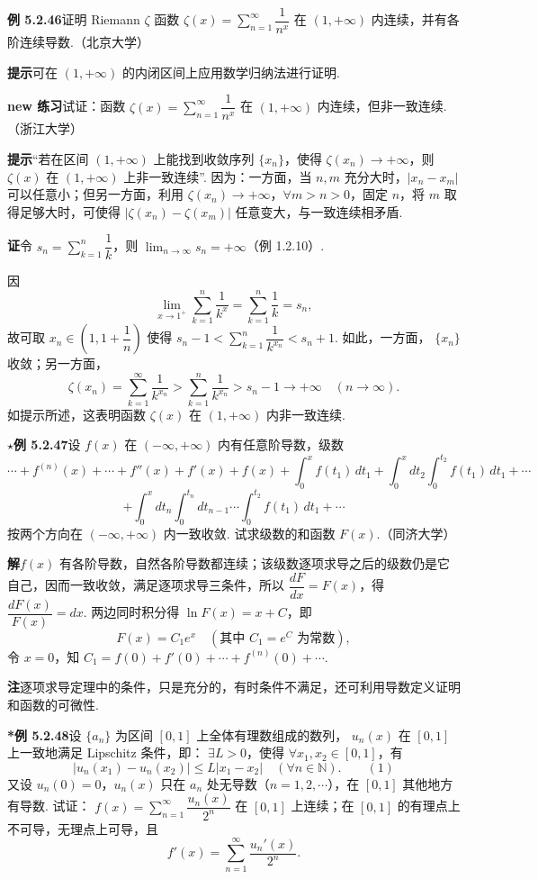 \documentclass[UTF8,12pt,a4paper,fontset=fandol]{ctexart}
\begin{document}
\noindent\textbf{例 5.2.46}\quad 证明 Riemann $\zeta$ 函数
$\zeta(x)=\displaystyle\sum_{n=1}^{\infty}\dfrac1{n^x}$ 在
$(1,+\infty)$ 内连续，并有各阶连续导数.（北京大学）

\noindent\textbf{提示}\quad 可在 $(1,+\infty)$ 的内闭区间上应用数学归纳法进行证明.

\noindent\textbf{new 练习}\quad 试证：函数
$\zeta(x)=\displaystyle\sum_{n=1}^{\infty}\dfrac1{n^x}$ 在
$(1,+\infty)$ 内连续，但非一致连续.（浙江大学）

\noindent\textbf{提示}\quad “若在区间 $(1,+\infty)$ 上能找到收敛序列 $\{x_n\}$，使得
$\zeta(x_n)\to+\infty$，则 $\zeta(x)$ 在 $(1,+\infty)$ 上非一致连续”. 因为：一方面，当
$n,m$ 充分大时，$|x_n-x_m|$ 可以任意小；但另一方面，利用
$\zeta(x_n)\to+\infty$，$\forall m>n>0$，固定 $n$，将 $m$ 取得足够大时，可使得
$|\zeta(x_n)-\zeta(x_m)|$ 任意变大，与一致连续相矛盾.

\noindent\textbf{证}\quad 令 $s_n=\displaystyle\sum_{k=1}^{n}\dfrac1k$，则
$\displaystyle\lim_{n\to\infty}s_n=+\infty$（例 1.2.10）.

因
\[
  \lim_{x\to1^+}\sum_{k=1}^{n}\frac1{k^x}
  =\sum_{k=1}^{n}\frac1k=s_n,
\]
故可取 $x_n\in\left(1,1+\dfrac1n\right)$ 使得
$s_n-1<\displaystyle\sum_{k=1}^{n}\dfrac1{k^{x_n}}<s_n+1$. 如此，一方面，
$\{x_n\}$ 收敛；另一方面，
\[
  \zeta(x_n)=\sum_{k=1}^{\infty}\frac1{k^{x_n}}
  >\sum_{k=1}^{n}\frac1{k^{x_n}}>s_n-1\to+\infty\quad(n\to\infty).
\]
如提示所述，这表明函数 $\zeta(x)$ 在 $(1,+\infty)$ 内非一致连续.

\noindent\textbf{$\star$例 5.2.47}\quad 设 $f(x)$ 在 $(-\infty,+\infty)$ 内有任意阶导数，级数
\[
\cdots+f^{(n)}(x)+\cdots+f''(x)+f'(x)+f(x)
+\int_0^x f(t_1)\,dt_1
+\int_0^xdt_2\int_0^{t_2}f(t_1)\,dt_1+\cdots
\]
\[
  +\int_0^xdt_n\int_0^{t_n}dt_{n-1}\cdots\int_0^{t_2}f(t_1)\,dt_1+\cdots
\]
按两个方向在 $(-\infty,+\infty)$ 内一致收敛. 试求级数的和函数 $F(x)$.（同济大学）

\noindent\textbf{解}\quad $f(x)$ 有各阶导数，自然各阶导数都连续；该级数逐项求导之后的级数仍是它自己，因而一致收敛，满足逐项求导三条件，所以
$\dfrac{dF}{dx}=F(x)$，得 $\dfrac{dF(x)}{F(x)}=dx$. 两边同时积分得
$\ln F(x)=x+C$，即
\[
  F(x)=C_1e^x\quad(\text{其中 }C_1=e^C\text{ 为常数}),
\]
令 $x=0$，知 $C_1=f(0)+f'(0)+\cdots+f^{(n)}(0)+\cdots$.

\noindent\textbf{注}\quad 逐项求导定理中的条件，只是充分的，有时条件不满足，还可利用导数定义证明和函数的可微性.

\noindent\textbf{*例 5.2.48}\quad 设 $\{a_n\}$ 为区间 $[0,1]$ 上全体有理数组成的数列，
$u_n(x)$ 在 $[0,1]$ 上一致地满足 Lipschitz 条件，即：
$\exists L>0$，使得 $\forall x_1,x_2\in[0,1]$，有
\[
  |u_n(x_1)-u_n(x_2)|\le L|x_1-x_2|\quad(\forall n\in\mathbb N).
\qquad(1)
\]
又设 $u_n(0)=0$，$u_n(x)$ 只在 $a_n$ 处无导数（$n=1,2,\cdots$），在
$[0,1]$ 其他地方有导数. 试证：
$f(x)=\displaystyle\sum_{n=1}^{\infty}\dfrac{u_n(x)}{2^n}$ 在
$[0,1]$ 上连续；在 $[0,1]$ 的有理点上不可导，无理点上可导，且
\[
  f'(x)=\sum_{n=1}^{\infty}\frac{u_n'(x)}{2^n}.
\]
\end{document}
